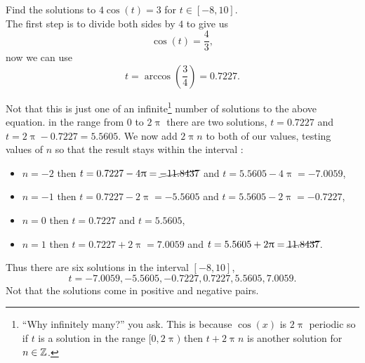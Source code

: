 \begin{ex}
Find the solutions to $4\cos(t)=3$ for $t\in[-8,10]$. \\

The first step is to divide both sides by $4$ to give us
\begin{equation*}
\cos(t)=\frac{4}{3},
\end{equation*}
now we can use
\begin{equation*}
t=\arccos\left(\frac{3}{4}\right)=0.7227.
\end{equation*}

Not that this is just one of an infinite\footnote{``Why infinitely many?'' you ask. This is because $\cos(x)$ is $2\uppi$ periodic so if $t$ is a solution in the range $[0,2\uppi)$ then $t+2\uppi n$ is another solution for $n\in \mathbb{Z}$. } number of solutions to the above equation. in the range from $0$ to $2\uppi$ there are two solutions, $t=0.7227$ and $t=2\uppi-0.7227=5.5605$. We now add $2\uppi n$ to both of our values, testing values of $n$ so that the result stays within the interval :

\begin{itemize}
    \item $n=-2$  then $ t=0.7227-4\uppi =\cancel{-11.8437}$ and $t=5.5605-4\uppi=-7.0059$,
    \item $n=-1$ then $ t=0.7227-2\uppi = -5.5605$ and $t=5.5605-2\uppi=-0.7227$,
    \item $n=0$ then $t=0.7227$ and $t=5.5605$,
    \item $n=1$  then $t=0.7227+2\uppi = 7.0059$ and $ t=5.5605+2\uppi=\cancel{11.8437}$.
\end{itemize}
Thus there are six solutions in the interval $[-8,10]$,
\begin{equation*}
t=-7.0059, -5.5605, -0.7227, 0.7227, 5.5605, 7.0059.
\end{equation*}
Not that the solutions come in positive and negative pairs.
\end{ex}

